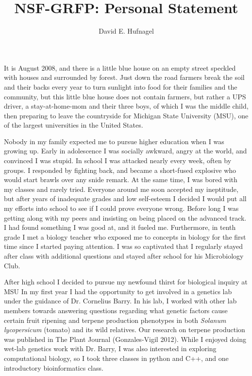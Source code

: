 \documentclass[12pt]{amsart}
\title{NSF-GRFP: Personal Statement}
\author{David E. Hufnagel}
\begin{document}
\maketitle
It is August 2008, and there is a little blue house on an empty street speckled with houses and surrounded by forest. 
Just down the road farmers break the soil and their backs every year to turn sunlight into food for their families and the community, but this little blue house does not contain farmers, but rather a UPS driver, a stay-at-home-mom and their three boys, of which I was the middle child, then preparing to leave the countryside for Michigan State University (MSU), one of the largest universities in the United States.

Nobody in my family expected me to pursue higher education when I was growing up.  
Early in adolescence I was socially awkward, angry at the world, and convinced I was stupid.  
In school I was attacked nearly every week, often by groups.  
I responded by fighting back, and became a short-fused explosive who would start brawls over any snide remark.
At the same time, I was bored with my classes and rarely tried.  
Everyone around me soon accepted my ineptitude, but after years of inadequate grades and low self-esteem I decided I would put all my efforts into school to see if I could prove everyone wrong.  
Before long I was getting along with my peers and insisting on being placed on the advanced track.  
I had found something I was good at, and it fueled me.  
Furthermore, in tenth grade I met a biology teacher who exposed me to concepts in biology for the first time since I started paying attention.  
I was so captivated that I regularly stayed after class with additional questions and stayed after school for his Microbiology Club.  

After high school I decided to pursue my newfound thirst for biological inquiry at MSU
In my first year I had the opportunity to get involved in a genetics lab under the guidance of Dr. Cornelius Barry. 
In his lab, I worked with other lab members towards answering questions regarding what genetic factors cause certain fruit ripening and terpene production phenotypes in both  \textit{Solanum lycopersicum} (tomato) and its wild relatives.  
Our research on terpene production was published in The Plant Journal (Gonzales-Vigil 2012).  
While I enjoyed doing wet-lab genetics work with Dr. Barry, I was also interested in exploring computational biology, so I took three classes in python and C++, and one introductory bioinformatics class.
\end{document}
